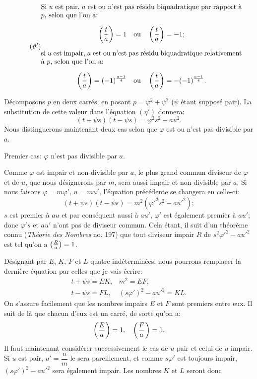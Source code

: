 \begin{equation*}\tag{$\vartheta'$}
\begin{minipage}{0.84\textwidth}
Si $u$ est pair, $a$ est ou n'est pas résidu biquadratique par rapport
à $p$, selon que l'on a:
\[
\leg{t}{a}=1\quad\text{ou}\quad\leg{t}{a}=-1;
\]
si $u$ est impair, $a$ est ou n'est pas résidu biquadratique relativement
à $p$, selon que l'on a:
\[
\leg{t}{a}=(-1)^{\frac{a-1}{4}}\quad\text{ou}\quad\leg{t}{a}=-(-1)^{\frac{a-1}{4}}.
\]
\end{minipage}
\end{equation*}
\par\indent
Décomposons $p$ en deux carrés, en posant $p=\varphi^2+\psi^2$ ($\psi$ étant supposé
pair). La substitution de cette valeur dans l'équation $(\eta')$ donnera:
\[
(t+\psi s)(t-\psi s)=\varphi^2s^2-au^2.
\]
Nous distinguerons maintenant deux cas selon que $\varphi$ est ou n'est pas divisible par $a$.
\par\indent
Premier cas: $\varphi$ n'est pas divisible par $a$.
\par\indent
Comme $\varphi$ est impair et non-divisible par $a$, le plus grand commun diviseur
de $\varphi$ et de $u$, que nous désignerons par $m$, sera aussi impair et non-divisible
par $a$. Si nous faisons $\varphi=m\varphi'$, $u=mu'$, l'équation précédente se
changera en celle-ci:
\[
(t+\psi s)(t-\psi s)=m^2(\varphi'^2s^2-au'^2);
\]
$s$ est premier à $au$ et par conséquent aussi à $au'$, $\varphi'$ est également premier
à $au'$; donc $\varphi's$ et $au'$ n'ont pas de diviseur commun. Cela étant, il suit
d'un théorème connu (\emph{Théorie des Nombres} no. 197) que tout diviseur impair
$R$ de $s^2\varphi'^2-au'^2$ est tel qu'on a $\left(\frac{R}{a}\right)=1$.
\par\indent
Désignant par $E$, $K$, $F$ et $L$ quatre indéterminées, nous pourrons remplacer
la dernière équation par celles que je vais écrire:
\[
\begin{array}{ll}
t+\psi s=EK,&m^2=EF,\\
t-\psi s=FL,&(s\varphi')^2-au'^2=KL.
\end{array}
\]
On s'assure facilement que les nombres impairs $E$ et $F$ sont premiers entre
eux. Il suit de là que chacun d'eux est un carré, de sorte qu'on a:
\[
\left(\frac{E}{a}\right)=1,\quad\left(\frac{F}{a}\right)=1.
\]
Il faut maintenant considérer successivement le cas de $u$ pair et celui de $u$
impair. Si $u$ est pair, $u'=\dfrac{u}{m}$ le sera pareillement, et comme $s\varphi'$ est toujours
impair, $(s\varphi')^2-au'^2$ sera également impair. Les nombres $K$ et $L$ seront donc
